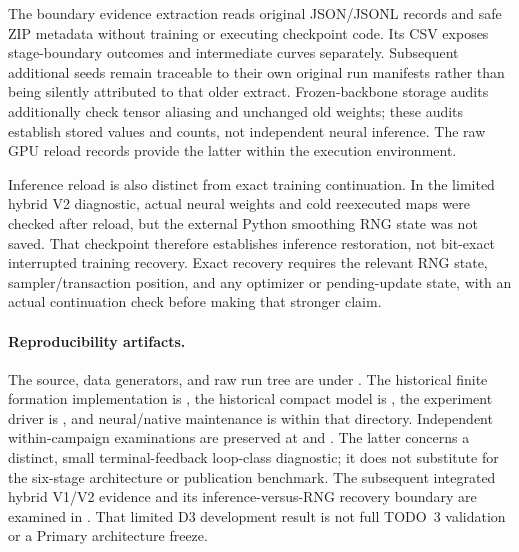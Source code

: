 The boundary evidence extraction reads original JSON/JSONL records and safe ZIP
metadata without training or executing checkpoint code. Its CSV exposes
stage-boundary outcomes and intermediate curves separately. Subsequent
additional seeds remain traceable to their own original run manifests rather
than being silently attributed to that older extract. Frozen-backbone storage
audits additionally check tensor aliasing and unchanged old weights; these
audits establish stored values and counts, not independent neural inference.
The raw GPU reload records provide the latter within the execution environment.

Inference reload is also distinct from exact training continuation. In the
limited hybrid V2 diagnostic, actual neural weights and cold reexecuted maps
were checked after reload, but the external Python smoothing RNG state was not
saved. That checkpoint therefore establishes inference restoration, not
bit-exact interrupted training recovery. Exact recovery requires the relevant
RNG state, sampler/transaction position, and any optimizer or pending-update
state, with an actual continuation check before making that stronger claim.

\paragraph{Reproducibility artifacts.}
The source, data generators, and raw run tree are under
.
The historical finite formation implementation is ,
the historical compact model is , the experiment driver
is , and neural/native maintenance is
 within that directory. Independent
within-campaign examinations are preserved at
and
.
The latter concerns a distinct, small terminal-feedback loop-class diagnostic;
it does not substitute for the six-stage architecture or publication benchmark.
The subsequent integrated hybrid V1/V2 evidence and its inference-versus-RNG
recovery boundary are examined in
.
That limited D3 development result is not full TODO~3 validation or a Primary
architecture freeze.

